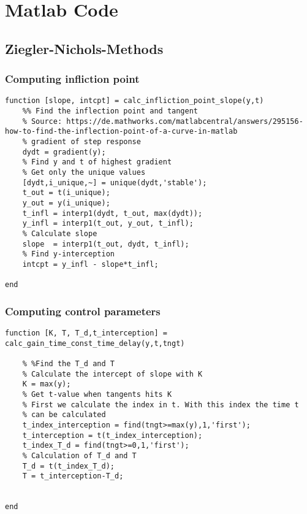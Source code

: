 \section{Matlab Code}

\subsection{Ziegler-Nichols-Methods} \label{app:ZN}

\subsubsection{Computing infliction point} \label{app:ZN:infl_point}

\begin{lstlisting}[style=Matlab-editor,caption={Matlab code for calculating the infliction point.},captionpos=b,label={list:app:infliction_point}]
function [slope, intcpt] = calc_infliction_point_slope(y,t)
    %% Find the inflection point and tangent
    % Source: https://de.mathworks.com/matlabcentral/answers/295156-how-to-find-the-inflection-point-of-a-curve-in-matlab
    % gradient of step response
    dydt = gradient(y);
    % Find y and t of highest gradient
    % Get only the unique values
    [dydt,i_unique,~] = unique(dydt,'stable');
    t_out = t(i_unique);
    y_out = y(i_unique);
    t_infl = interp1(dydt, t_out, max(dydt));
    y_infl = interp1(t_out, y_out, t_infl);
    % Calculate slope
    slope  = interp1(t_out, dydt, t_infl);
    % Find y-interception
    intcpt = y_infl - slope*t_infl;

end
\end{lstlisting}

\subsubsection{Computing control parameters} \label{app:ZN:control_para}

\begin{lstlisting}[style=Matlab-editor,caption={Computation of $T_d$, $T$ and $K$ in Matlab.},captionpos=b,label={list:app:controller_parameters}]
function [K, T, T_d,t_interception] = calc_gain_time_const_time_delay(y,t,tngt)

    % %Find the T_d and T
    % Calculate the intercept of slope with K
    K = max(y);
    % Get t-value when tangents hits K
    % First we calculate the index in t. With this index the time t
    % can be calculated
    t_index_interception = find(tngt>=max(y),1,'first');
    t_interception = t(t_index_interception);
    t_index_T_d = find(tngt>=0,1,'first');
    % Calculation of T_d and T
    T_d = t(t_index_T_d);
    T = t_interception-T_d;
    
    
end
\end{lstlisting}


